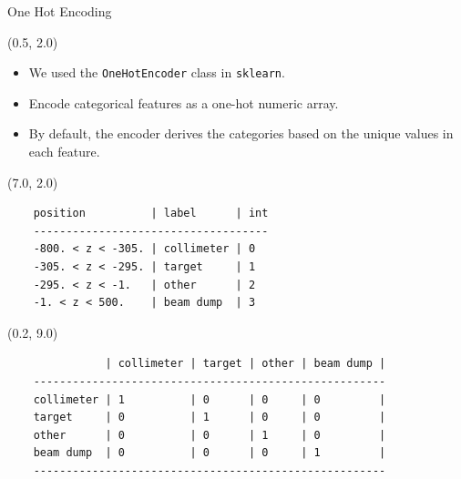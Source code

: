 \documentclass[12pt, xcolor={dvipsnames}, aspectratio = 169]{beamer}
\begin{document}
\begin{frame}[fragile]{One Hot Encoding}

\begin{textblock}{7.0}(0.5, 2.0)

    \begin{itemize}
        \item We used the \verb|OneHotEncoder| class in \verb|sklearn|.
        \item Encode categorical features as a one-hot numeric array.
        \item By default, the encoder derives the categories based on the unique values in each feature.
    \end{itemize}

\end{textblock}

\begin{textblock}{7.0}(7.0, 2.0)
    \begin{verbatim}
    position          | label      | int
    ------------------------------------
    -800. < z < -305. | collimeter | 0
    -305. < z < -295. | target     | 1
    -295. < z < -1.   | other      | 2
    -1. < z < 500.    | beam dump  | 3
    \end{verbatim}
\end{textblock}

\begin{textblock}{7.0}(0.2, 9.0)
    \begin{verbatim}
               | collimeter | target | other | beam dump |
    ------------------------------------------------------
    collimeter | 1          | 0      | 0     | 0         |
    target     | 0          | 1      | 0     | 0         |
    other      | 0          | 0      | 1     | 0         |
    beam dump  | 0          | 0      | 0     | 1         |
    ------------------------------------------------------
    \end{verbatim}
\end{textblock}

\end{frame}
\end{document}
